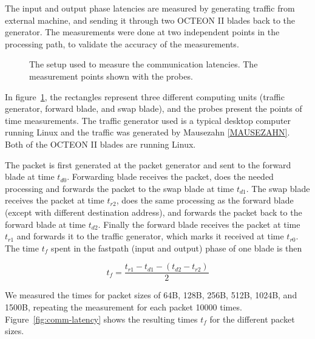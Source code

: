 The input and output phase latencies are measured by generating traffic from external machine, and sending it through two OCTEON II blades back to the generator. The measurements were done at two independent points in the processing path, to validate the accuracy of the measurements.

\begin{figure}[ht]
  \begin{center}
    
    \caption{The setup used to measure the communication latencies. The measurement points shown with the probes.}
    \label{fig:comm-setup}
  \end{center}
\end{figure}

In figure~\ref{fig:comm-setup}, the rectangles represent three different computing units (traffic generator, forward blade, and swap blade), and the probes present the points of time measurements. The traffic generator used is a typical desktop computer running Linux and the traffic was generated by Mausezahn \ref{MAUSEZAHN}. Both of the OCTEON II blades are running Linux.

The packet is first generated at the packet generator and sent to the forward blade at time $t_{d0}$. Forwarding blade receives the packet, does the needed processing and forwards the packet to the swap blade at time $t_{d1}$. The swap blade receives the packet at time $t_{r2}$, does the same processing as the forward blade (except with different destination address), and forwards the packet back to the forward blade at time $t_{d2}$. Finally the forward blade receives the packet at time $t_{r1}$ and forwards it to the traffic generator, which marks it received at time $t_{r0}$. The time $t_{f}$ spent in the fastpath (input and output) phase of one blade is then

\begin{equation}
  \label{eq:1}
  t_{f} = \frac{t_{r1} - t_{d1} - (t_{d2} - t_{r2})}{2}
\end{equation}

We measured the times for packet sizes of 64B, 128B, 256B, 512B, 1024B, and 1500B, repeating the measurement for each packet 10000 times. Figure~\ref{fig:comm-latency} shows the resulting times $t_{f}$ for the different packet sizes.

